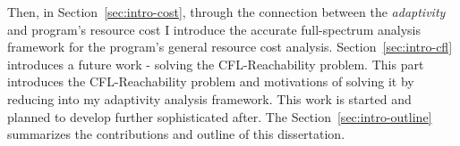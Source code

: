  Then, in Section~\ref{sec:intro-cost}, through the connection between the \emph{adaptivity} and program's resource cost
I introduce 
 the accurate full-spectrum analysis framework for the program's general resource cost analysis.
 Section~\ref{sec:intro-cfl} introduces a future work - solving the CFL-Reachability problem.
This part introduces the CFL-Reachability problem and motivations of 
solving it by reducing into my adaptivity analysis framework. 
 This work is started and planned to 
develop further sophisticated after.
The Section~\ref{sec:intro-outline} summarizes the contributions and outline of this dissertation.
